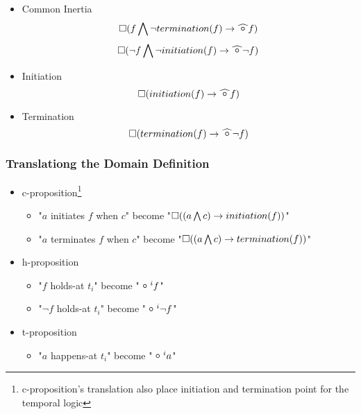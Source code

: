 \begin{itemize}
  \item Common Inertia
  $$\alwaysF(f \bigwedge \neg termination(f) \rightarrow \wnext f)$$
  $$\alwaysF(\neg f \bigwedge \neg initiation(f) \rightarrow \wnext\neg f)$$
  \item Initiation $$\alwaysF(initiation(f)\rightarrow\wnext f)$$
  \item Termination $$\alwaysF(termination(f)\rightarrow\wnext \neg f)$$
\end{itemize}

\subsubsection{Translationg the Domain Definition}

\begin{itemize}
  \item c-proposition\footnote{c-proposition's translation also place initiation and termination point for the temporal logic}
  \begin{itemize}
    \item "$a$ initiates $f$ when $c$" become "$\square((a\bigwedge c)\rightarrow initiation(f))$"
    \item "$a$ terminates $f$ when $c$" become "$\square((a\bigwedge c)\rightarrow termination(f))$"
  \end{itemize}
  \item h-proposition
  \begin{itemize}
    \item "$f$ holds-at $t_i$" become "$\next^{i}f$"
    \item "$\neg f$ holds-at $t_i$" become "$\next^{i} \neg f$"
  \end{itemize}
  \item t-proposition
  \begin{itemize}
    \item "$a$ happens-at $t_i$" become "$\next^{i}a$"
  \end{itemize}
\end{itemize}

